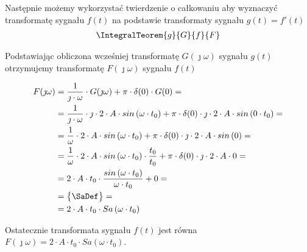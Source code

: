 \begin{task}
Następnie możemy wykorzystać twierdzenie o całkowaniu aby wyznaczyć transformatę sygnału $f(t)$ na podstawie transformaty sygnału $g(t)=f'(t)$
\begin{align*}
\IntegralTeorem{g}{G}{f}{F}
\end{align*}

Podstawiając obliczona wcześniej transformatę $G(\jmath \omega)$ sygnału $g(t)$ otrzymujemy transformatę $F(\jmath \omega)$ sygnału $f(t)$

\begin{align*}
F(\jmath \omega) &= \frac{1}{\jmath \cdot \omega} \cdot G(\jmath \omega) + \pi \cdot \delta(0) \cdot G(0)=\\
&=\frac{1}{\jmath \cdot \omega} \cdot \jmath \cdot 2 \cdot A \cdot sin\left( \omega \cdot t_0\right) + \pi \cdot \delta(0) \cdot \jmath \cdot 2 \cdot A \cdot sin\left( 0 \cdot t_0\right)=\\
&=\frac{1}{\omega} \cdot 2 \cdot A \cdot sin\left( \omega \cdot t_0\right) + \pi \cdot \delta(0) \cdot \jmath \cdot 2 \cdot A \cdot sin\left( 0\right)=\\
&=\frac{1}{\omega} \cdot 2 \cdot A \cdot sin\left( \omega \cdot t_0\right) \cdot \frac{t_0}{t_0} + \pi \cdot \delta(0) \cdot \jmath \cdot 2 \cdot A \cdot 0=\\
&= 2 \cdot A \cdot t_0 \cdot \frac{sin\left( \omega \cdot t_0\right)}{\omega \cdot t_0} + 0=\\
&=\begin{Bmatrix}
\SaDef
\end{Bmatrix}=\\
&= 2 \cdot A \cdot t_0 \cdot Sa\left( \omega \cdot t_0\right)
\end{align*}

Ostatecznie transformata sygnału $f(t)$ jest równa $F(\jmath \omega)=2 \cdot A \cdot t_0 \cdot Sa\left( \omega \cdot t_0\right)$.
\end{task}

